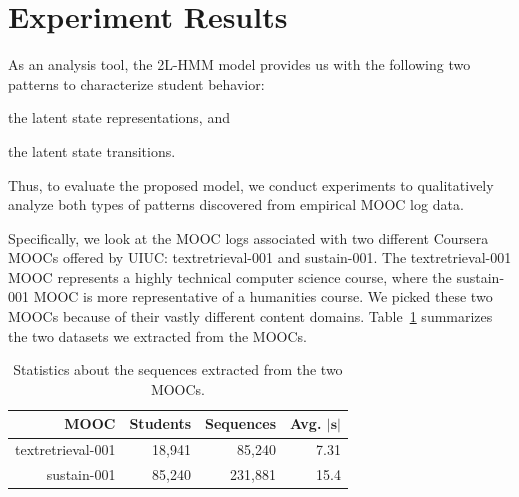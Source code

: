 \newcommand{\textretrieval}{textretrieval-001}

\newcommand{\sustain}{sustain-001}

\newcommand{\UIUC}{UIUC}

\section{Experiment Results}
As an analysis tool, the 2L-HMM model provides us with the following two
patterns to characterize student behavior:
\begin{enumerate*}[label=(\arabic*)]
  \item the latent state representations, and
  \item the latent state transitions.
\end{enumerate*}
Thus, to evaluate the proposed model, we conduct experiments to
qualitatively analyze both types of patterns discovered from empirical MOOC
log data.

Specifically, we look at the MOOC logs associated with two different
Coursera MOOCs offered by \UIUC{}: \textretrieval{} and \sustain{}.  The
\textretrieval{} MOOC represents a highly technical computer science course,
where the \sustain{} MOOC is more representative of a humanities course. We
picked these two MOOCs because of their vastly different content domains.
Table~\ref{table:datasets} summarizes the two datasets we extracted from
the MOOCs.

\begin{table}
  \begin{center}
    \caption{Statistics about the sequences extracted from the two MOOCs.}
    \label{table:datasets}
    \begin{tabular}{rrrr}
      \textbf{MOOC} & \textbf{Students} & \textbf{Sequences} & \textbf{Avg.
      $|\mathbf{s}|$}\\\hline
      \textretrieval{} & 18,941 & 85,240 & 7.31\\
      \sustain{} & 85,240 & 231,881 & 15.4
    \end{tabular}
  \end{center}
\end{table}

